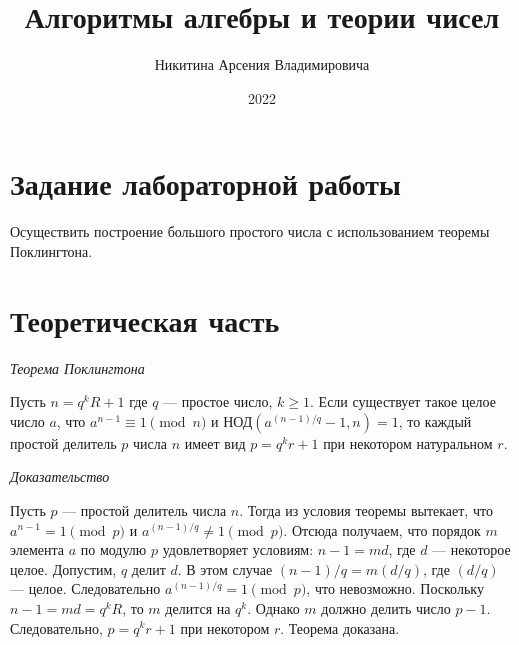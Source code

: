 \documentclass[bachelor, och, labwork]{shiza}
\begin{document}
\title{Алгоритмы алгебры и теории чисел}





\author{Никитина Арсения Владимировича}




\date{2022}

\maketitle



\tableofcontents

\section{Задание лабораторной работы}

Осуществить построение большого простого числа с использованием теоремы 
Поклингтона.

\section{Теоретическая часть}

\begin{center}
    \textit {Теорема Поклингтона}
\end{center}

Пусть $n=q^{k}R+1$ где $q$ --- простое число, $k\geqslant 1$. Если существует 
такое целое число $a$, что $a^{n-1} \equiv 1 \pmod n$ и НОД$(a^{{(n-1)}/q}-1,n)=1$, 
то каждый простой делитель $p$ числа $n$ имеет вид $p=q^{k}r+1$ при некотором 
натуральном $r$.

\begin{center}
    \textit {Доказательство}
\end{center}

Пусть $p$ --- простой делитель числа $n$. Тогда из условия теоремы вытекает, 
что $a^{n-1}=1{\pmod {p}}$ и $a^{(n-1)/q}\neq 1{\pmod {p}}$. Отсюда получаем, 
что порядок $m$ элемента $a$ по модулю $p$ удовлетворяет условиям: $n-1=md$, где
$d$ --- некоторое целое. Допустим, $q$ делит $d$. В этом случае $(n-1)/q=m(d/q)$,
где $(d/q)$ --- целое. Следовательно $a^{(n-1)/q}=1{\pmod {p}}$, что невозможно. 
Поскольку $n-1=md=q^{k}R$, то $m$ делится на $q^k$. Однако $m$ должно делить 
число $p-1$. Следовательно, $p=q^{k}r+1$ при некотором $r$. Теорема доказана.
\end{document}
